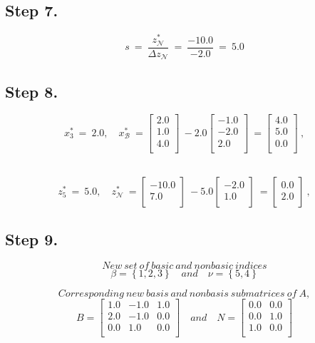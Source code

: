 \subsection{Step 7.}
\[
s \ =\ \frac{z_{\mathcal N}^{*}}{ \Delta z_{\mathcal N}}\ =\ \frac{-10.0}{-2.0}\ =\ 5.0
\]
\subsection{Step 8.}
\[
x_{3}^{*}\ =\ 2.0, \quad x_{\mathcal B}^{*}\ =\begin{bmatrix}
2.0 \\ 1.0 \\ 4.0 \\ 
\end{bmatrix}\ -2.0\begin{bmatrix}
-1.0 \\ -2.0 \\ 2.0 \\ 
\end{bmatrix}\ =\begin{bmatrix}
4.0 \\ 5.0 \\ 0.0 \\ 
\end{bmatrix}\ ,
\]
\

\[
z_{5}^{*}\ =\ 5.0, \quad z_{\mathcal N}^{*}\ =\begin{bmatrix}
-10.0 \\ 7.0 \\ 
\end{bmatrix}\ -5.0\begin{bmatrix}
-2.0 \\ 1.0 \\ 
\end{bmatrix}\ =\begin{bmatrix}
0.0 \\ 2.0 \\ 
\end{bmatrix}\ ,
\]
\subsection{Step 9.}

\[ New\ set\  of\  basic\  and\  nonbasic\  indices \]
\[
\beta= \left\{1, 2, 3\right\} \quad and \quad  \nu=\left\{5, 4\right\}
\]

\[
Corresponding\ new\ basis\ and\ nonbasis\ submatrices\ of\ A,
\]
\[
B =
\begin{bmatrix}
1.0 & -1.0 & 1.0 \\ 2.0 & -1.0 & 0.0 \\ 0.0 & 1.0 & 0.0 \\ 
\end{bmatrix} \quad and \quad
\mathit{N} =
\begin{bmatrix}
0.0 & 0.0 \\ 0.0 & 1.0 \\ 1.0 & 0.0 \\ 
\end{bmatrix}
\]

